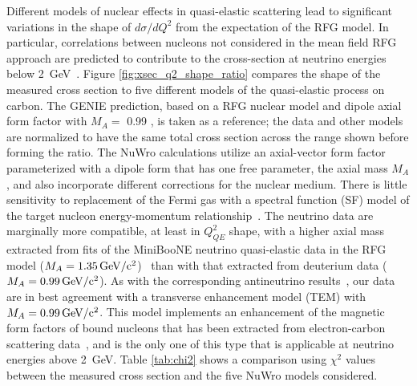 Different models of nuclear effects in quasi-elastic
scattering lead to significant variations in the shape of $d\sigma/dQ^2$ from
the expectation of the RFG model.
In particular, correlations between nucleons not considered in the mean field RFG approach are predicted to contribute to the cross-section at neutrino energies below 2~GeV~\cite{Martini:2010ex,Martini:2013sha,Nieves:2005rq}.
Figure \ref{fig:xsec_q2_shape_ratio} compares the shape of the measured cross section to five different models of the quasi-elastic process on carbon.  
The GENIE prediction, based on a RFG nuclear model and dipole axial form factor with $M_A = $ 0.99 \GeV, is taken as a reference; the data and other models are normalized to have the same total cross section across the range shown before forming the ratio.  The NuWro calculations utilize an axial-vector form factor parameterized with a dipole form that has one free parameter,  
the axial mass $M_A$, and also incorporate different
 corrections for the nuclear medium. 
There is little sensitivity 
to replacement of the Fermi gas with a spectral function (SF) 
model of the target nucleon energy-momentum relationship~\cite{Benhar:1994hw}.  
The neutrino data are marginally more compatible, at least in $Q^2_{QE}$ shape, with a higher axial
mass extracted from fits of the MiniBooNE neutrino quasi-elastic data
in the RFG model ($M_A=\unit[1.35]{GeV/c^2}$)~\cite{AguilarArevalo:2007ab} than with that extracted from deuterium data ($M_A=\unit[0.99]{GeV/c^2}$). 
As with the corresponding antineutrino results~\cite{nubarprl}, our data are in best agreement with  a transverse enhancement model (TEM)
 with $M_A=\unit[0.99]{GeV/c^2}$.  This model implements an enhancement of the magnetic form factors of bound nucleons that has been extracted from electron-carbon scattering data~\cite{Bodek:2011ps}, and is the only one of this type that is applicable at neutrino energies above 2~GeV.  Table \ref{tab:chi2} shows a comparison using $\chi^2$ values between the measured cross section and the five NuWro models considered.  



